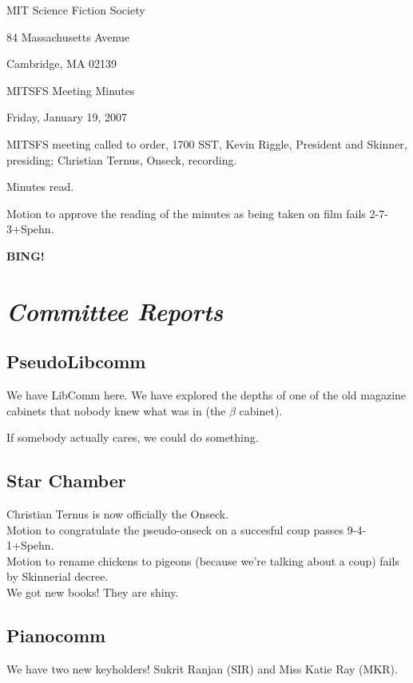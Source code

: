\documentclass[10pt]{article}
\newcommand{\bing}{{\bf BING!} }
\newcommand{\goto}[1]{\bing \vskip 12pt \section*{{\em{#1}}}}
\begin{document}
\begin{center}

MIT Science Fiction Society

84 Massachusetts Avenue

Cambridge, MA 02139

\vspace{12pt}

MITSFS Meeting Minutes

Friday, January 19, 2007

\end{center}

\vspace{18pt}

\setlength{\parskip}{6pt}

\noindent
MITSFS meeting called to order, 1700 SST,
Kevin Riggle, President and Skinner, presiding; Christian Ternus, Onseck, recording.

Minutes read.

Motion to approve the reading of the minutes as being taken on film fails 2-7-3+Spehn.

\goto{Committee Reports}
\subsection{PseudoLibcomm}

We have LibComm here.  We have explored the depths of one of the old magazine cabinets that nobody knew what was in (the $\beta$ cabinet).

If somebody actually cares, we could do something.

\subsection{Star Chamber}

Christian Ternus is now officially the Onseck.\\
Motion to congratulate the pseudo-onseck on a succesful coup passes 9-4-1+Spehn.\\
Motion to rename chickens to pigeons (because we're talking about a coup) fails by Skinnerial decree.\\
We got new books!  They are shiny.\\

\subsection{Pianocomm}

We have two new keyholders!  Sukrit Ranjan (SIR) and Miss Katie Ray (MKR).
\end{document}

